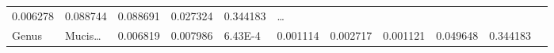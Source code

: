 \documentclass[
]{article}
\begin{document}
\begin{longtable}[]{@{}lllllllllll@{}}
\begin{minipage}[t]{0.06\columnwidth}
0.006278\strut
\end{minipage} & \begin{minipage}[t]{0.09\columnwidth}\raggedright
0.088744\strut
\end{minipage} & \begin{minipage}[t]{0.06\columnwidth}\raggedright
0.088691\strut
\end{minipage} & \begin{minipage}[t]{0.06\columnwidth}\raggedright
0.027324\strut
\end{minipage} & \begin{minipage}[t]{0.06\columnwidth}\raggedright
0.344183\strut
\end{minipage} & \begin{minipage}[t]{0.03\columnwidth}\raggedright
\ldots{}\strut
\end{minipage}\tabularnewline
\begin{minipage}[t]{0.06\columnwidth}\raggedright
Genus\strut
\end{minipage} & \begin{minipage}[t]{0.06\columnwidth}\raggedright
Mucis\ldots{}\strut
\end{minipage} & \begin{minipage}[t]{0.09\columnwidth}\raggedright
0.006819\strut
\end{minipage} & \begin{minipage}[t]{0.06\columnwidth}\raggedright
0.007986\strut
\end{minipage} & \begin{minipage}[t]{0.09\columnwidth}\raggedright
6.43E-4\strut
\end{minipage} & \begin{minipage}[t]{0.06\columnwidth}\raggedright
0.001114\strut
\end{minipage} & \begin{minipage}[t]{0.09\columnwidth}\raggedright
0.002717\strut
\end{minipage} & \begin{minipage}[t]{0.06\columnwidth}\raggedright
0.001121\strut
\end{minipage} & \begin{minipage}[t]{0.06\columnwidth}\raggedright
0.049648\strut
\end{minipage} & \begin{minipage}[t]{0.06\columnwidth}\raggedright
0.344183\strut
\end{minipage} & \begin{minipage}[t]{0.03\columnwidth}\raggedright

\end{minipage}
\end{longtable}
\end{document}
